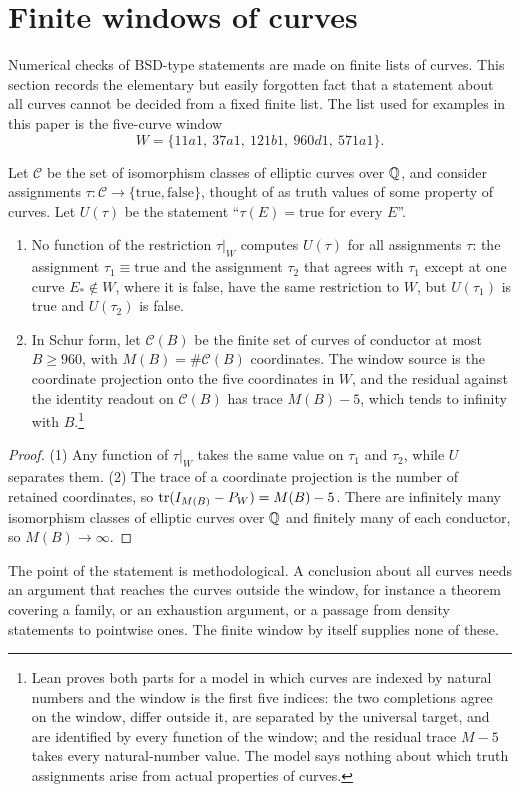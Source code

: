 \section{Finite windows of curves}
\label{sec:global-audit-no-go}

Numerical checks of BSD-type statements are made on finite lists of
curves.  This section records the elementary but easily forgotten fact
that a statement about all curves cannot be decided from a fixed finite
list.  The list used for examples in this paper is the five-curve window
\[
  W=\{11a1,\ 37a1,\ 121b1,\ 960d1,\ 571a1\}.
\]

\begin{theorem}\label{thm:apparatus:finite-window-no-go}
Let $\mathcal C$ be the set of isomorphism classes of elliptic curves over
$\mathbb{Q}$, and consider assignments $\tau:\mathcal C\to\{\mathrm{true},
\mathrm{false}\}$, thought of as truth values of some property of curves.
Let $U(\tau)$ be the statement ``$\tau(E)=\mathrm{true}$ for every $E$''.
\begin{enumerate}
\item No function of the restriction $\tau|_W$ computes $U(\tau)$ for all
  assignments $\tau$: the assignment $\tau_1\equiv\mathrm{true}$ and the
  assignment $\tau_2$ that agrees with $\tau_1$ except at one curve
  $E_*\notin W$, where it is false, have the same restriction to $W$, but
  $U(\tau_1)$ is true and $U(\tau_2)$ is false.
\item In Schur form, let $\mathcal C(B)$ be the finite set of curves of
  conductor at most $B\ge960$, with $M(B)=\#\mathcal C(B)$ coordinates.
  The window source is the coordinate projection onto the five
  coordinates in $W$, and the residual against the identity readout on
  $\mathcal C(B)$ has trace $M(B)-5$, which tends to infinity with $B$.\footnote{Lean proves both parts for a model in which curves are indexed
by natural numbers and the window is the first five indices: the two
completions agree on the window, differ outside it, are separated by the
universal target, and are identified by every function of the window;
and the residual trace $M-5$ takes every natural-number value.  The model
says nothing about which truth assignments arise from actual properties
of curves.}
\end{enumerate}
\end{theorem}

\begin{proof}
(1) Any function of $\tau|_W$ takes the same value on $\tau_1$ and
$\tau_2$, while $U$ separates them.  (2) The trace of a coordinate
projection is the number of retained coordinates, so
$\operatorname{tr}(I_{M(B)}-P_W)=M(B)-5$.  There are infinitely many isomorphism classes
of elliptic curves over $\mathbb{Q}$ and finitely many of each conductor, so
$M(B)\to\infty$.
\end{proof}

The point of the statement is methodological.  A conclusion about all
curves needs an argument that reaches the curves outside the window, for
instance a theorem covering a family, or an exhaustion argument, or a
passage from density statements to pointwise ones.  The finite window by
itself supplies none of these.
